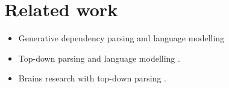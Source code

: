 \section{Related work}
\begin{itemize}
  \item Generative dependency parsing and language modelling \citep{Buys+2015:bayes-gen-dep,Buys+2015:neural-gen-dep,Buys+2018}
  \item Top-down parsing and language modelling \citep{Roark2001}.
  \item Brains research with top-down parsing \citep{Hale+2018:beam,brennan2016abstract}.
\end{itemize}
